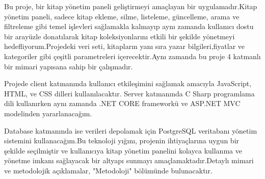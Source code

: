 


Bu proje, bir kitap yönetim paneli geliştirmeyi amaçlayan bir uygulamadır.Kitap yönetim paneli, sadece kitap ekleme, silme, listeleme, güncelleme, arama ve filtreleme gibi temel işlevleri sağlamakla kalmayıp aynı zamanda kullanıcı dostu bir arayüzle donatılarak kitap koleksiyonlarını etkili bir şekilde yönetmeyi hedefliyorum.Projedeki veri seti, kitapların yanı sıra yazar bilgileri,fiyatlar ve kategoriler gibi çeşitli parametreleri içerecektir.Aynı zamanda bu proje 4 katmanlı bir mimari yapısana sahip bir çalışmadır.

Projede client katmanında kullanıcı etkileşimini sağlamak amacıyla JavaScript, HTML, ve CSS dilleri kullanılacaktır. Server katmanında C Sharp programlama dili kullanırken aynı zamanda .NET CORE frameworkü ve ASP.NET MVC modelinden yararlanacağım.


Database katmanında ise verileri depolamak için PostgreSQL veritabanı yönetim sistemini kullanacağım.Bu teknoloji yığını, projenin ihtiyaçlarına uygun bir şekilde seçilmiştir ve kullanıcıya kitap yönetim panelini kolayca kullanma ve yönetme imkanı sağlayacak bir altyapı sunmayı amaçlamaktadır.Detaylı mimari ve metodolojik açıklamalar, "Metodoloji" bölümünde bulunacaktır.

